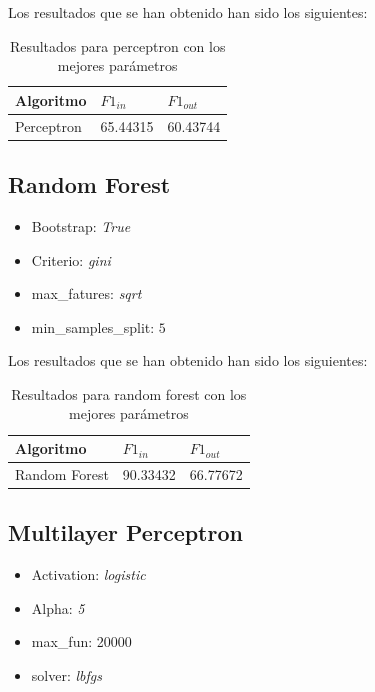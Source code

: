 \documentclass[11pt]{article}
\begin{document}
Los resultados que se han obtenido han sido los siguientes:

\begin{table}[h!]
\centering
\begin{tabular}{|l|l|l|}
\hline
Algoritmo    & $F1_{in}$  & $F1_{out}$ \\ \hline
Perceptron & 65.44315 & 60.43744 \\ \hline
\end{tabular}
\caption{Resultados para perceptron con los mejores parámetros }
\end{table}

\subsection{Random Forest}

\begin{itemize}
    \item Bootstrap: \textit{True}
    \item Criterio: \textit{gini}
    \item max\_fatures: \textit{sqrt}
    \item min\_samples\_split: $5$
\end{itemize}

Los resultados que se han obtenido han sido los siguientes:

\begin{table}[h!]
\centering
\begin{tabular}{|l|l|l|}
\hline
Algoritmo    & $F1_{in}$  & $F1_{out}$ \\ \hline
Random Forest   & 90.33432 & 66.77672 \\ \hline
\end{tabular}
\caption{Resultados para random forest con los mejores parámetros}
\end{table}

\subsection{Multilayer Perceptron}

\begin{itemize}
    \item Activation: \textit{logistic}
    \item Alpha: \textit{5}
    \item max\_fun: 20000
    \item solver: \textit{lbfgs}
\end{itemize}
\end{document}
